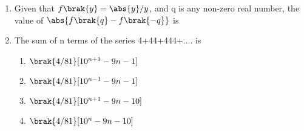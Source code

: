 \documentclass[a4paper, 11pt]{article}
\begin{document}
\begin{enumerate}
    \hfill{}

    \item Given that $f\brak{y}=\abs{y}/y$, and q is any non-zero real number, the value of $\abs{f\brak{q}-f\brak{-q}}$ is
    
    \begin{enumerate}
    \end{enumerate}

    \hfill{}

    \item The sum of n terms of the series 4+44+444+.... is
    
    \begin{enumerate}
        \item $\brak{4/81}[10^{n+1}-9n-1]$
        \item $\brak{4/81}[10^{n-1}-9n-1]$
        \item $\brak{4/81}[10^{n+1}-9n-10]$
        \item $\brak{4/81}[10^{n}-9n-10]$
    \end{enumerate}

    \hfill{}

\end{enumerate}
\end{document}
